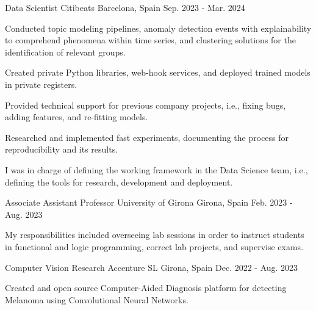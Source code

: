 

\begin{cventries}


  \cventry
  {Data Scientist} %
  {Citibeats} %
  {Barcelona, Spain} %
  {Sep. 2023 - Mar. 2024} %
  {
  \begin{cvitems}
    \item {Conducted topic modeling pipelines, anomaly detection events with
      explainability to comprehend phenomena within time series, and clustering
    solutions for the identification of relevant groups.}
    \item {Created private Python libraries, web-hook services, and deployed
      trained models in private registers.}
    \item {Provided technical support for previous company projects, i.e., fixing
      bugs, adding features, and re-fitting models.}
    \item {Researched and implemented fast experiments, documenting the process for
      reproducibility and its results.}
    \item {I was in charge of defining the working framework in the Data
      Science team, i.e., defining the tools for research, development and deployment.}
  \end{cvitems}
}


  \cventry
  {Associate Assistant Professor} %
  {University of Girona} %
  {Girona, Spain} %
  {Feb. 2023 - Aug. 2023} %
  {
    \begin{cvitems} %
    \item {My responsibilities included overseeing lab
      sessions in order to instruct students in functional and logic programming,
    correct lab projects, and supervise exams.}
    \end{cvitems}
    }


    \cventry
    {Computer Vision Research} %
    {Accenture SL} %
    {Girona, Spain} %
    {Dec. 2022 - Aug. 2023} %
    {
    \begin{cvitems}
    \item{Created and open source Computer-Aided Diagnosis platform for detecting Melanoma using Convolutional Neural Networks.}
    \end{cvitems}
    }


\end{cventries}
